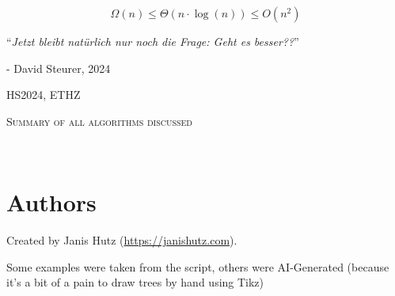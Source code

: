 \documentclass{article}
\begin{document}
\startDocument
\usetcolorboxes


\vspace{3cm}

\begin{Huge}
    \[
        \Omega(n) \leq \Theta(n \cdot \log(n)) \leq O(n^2)
    \]
\end{Huge}

\vspace{6cm}
\begin{center}
    \begin{Large}
        ``\textit{Jetzt bleibt natürlich nur noch die Frage: Geht es besser??}''
    \end{Large}

    \hspace{4cm} - David Steurer, 2024
\end{center}

\vspace{2cm}
\begin{center}
    HS2024, ETHZ\\[0.2cm]
    \begin{Large}
        \textsc{Summary of all algorithms discussed}
    \end{Large}\\[0.2cm]
\end{center}


\newpage




























\newpage
\section{Authors}
Created by Janis Hutz (\url{https://janishutz.com}).

Some examples were taken from the script, others were AI-Generated (because it's a bit of a pain to draw trees by hand using Tikz)
\end{document}
